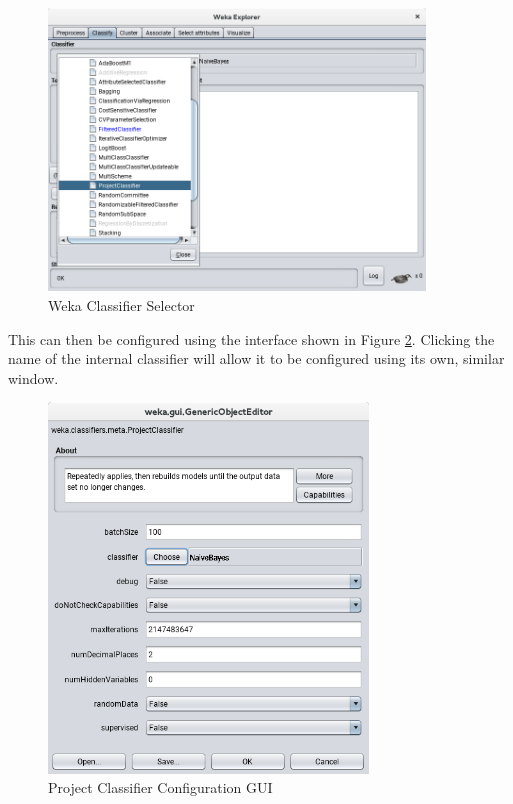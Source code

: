 \begin{figure}[ht!]
\centering
    \includegraphics[width=100mm]{images/explore_classify.png}
\caption{Weka Classifier Selector \label{explore_classify}}
\end{figure}

This can then be configured using the interface shown in Figure \ref{project_classifier_gui}. Clicking the name of the internal classifier will allow it to be configured using its own, similar window.

\begin{figure}[ht!]
\centering
    \includegraphics[width=85mm]{images/project_classifier_interface.png}
\caption{Project Classifier Configuration GUI \label{project_classifier_gui}}
\end{figure}


